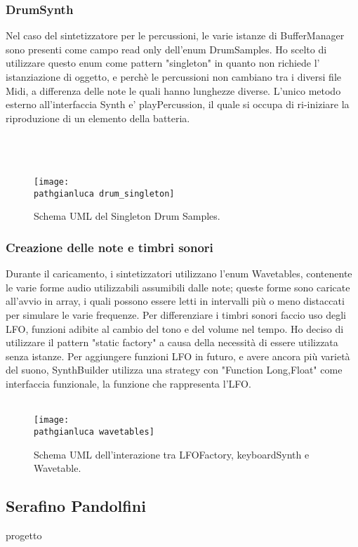 \documentclass[a4paper,12pt]{report}
\newcommand\pathgianluca{img/gianluca/}
\begin{document}
\subsubsection{DrumSynth}
Nel caso del sintetizzatore per le percussioni, le varie istanze di BufferManager sono presenti come campo read only dell'enum DrumSamples. Ho scelto di utilizzare questo enum come pattern "singleton" in quanto non richiede l' istanziazione di oggetto, e perchè le percussioni non cambiano tra i diversi file Midi, a differenza delle note le quali hanno lunghezze diverse.
L'unico metodo esterno all'interfaccia Synth e' playPercussion, il quale si occupa di ri-iniziare la riproduzione di un elemento della batteria. \\
\\ \\ \\
\begin{figure}[!htb]
	\centerline{\texttt{[image: \\pathgianluca drum\_singleton]}}
	\caption{Schema UML del Singleton Drum Samples.}
	\label{img:drumSingleton}
\end{figure}
\clearpage
\subsubsection{Creazione delle note e timbri sonori}
Durante il caricamento, i sintetizzatori utilizzano l'enum Wavetables, contenente le varie forme audio utilizzabili assumibili dalle note; queste forme sono caricate all'avvio in array, i quali possono essere letti in intervalli più o meno distaccati per simulare le varie frequenze.
Per differenziare i timbri sonori faccio uso degli LFO, funzioni adibite al cambio del tono e del volume nel tempo. Ho deciso di utilizzare il pattern "static factory" a causa della necessità di essere utilizzata senza istanze.
Per aggiungere funzioni LFO in futuro, e avere ancora più varietà del suono,
SynthBuilder utilizza una strategy con "Function Long,Float" come interfaccia funzionale, la funzione che rappresenta l'LFO. 
\\ \\
\begin{figure}[!htb]
	\centerline{\texttt{[image: \\pathgianluca wavetables]}}
	\caption{Schema UML dell'interazione tra LFOFactory, keyboardSynth e Wavetable.}
	\label{img:wavetables}
\end{figure}
\clearpage
\subsection{Serafino Pandolfini}
progetto 
\newpage
\end{document}

